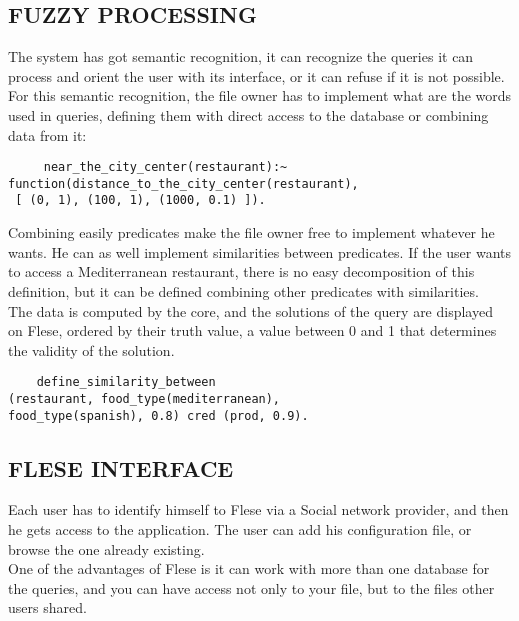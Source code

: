 \documentclass[a4paper,twoside]{article}
\begin{document}
\subsection{\uppercase{Fuzzy processing}}

The system has got semantic recognition, it can recognize the queries it can process and orient the user with its interface, or it can refuse if it is not possible.\\
For this semantic recognition, the file owner has to implement what are the words used in queries, defining them with direct access to the database or combining data from it:


\begin{small}
\begin{verbatim}
     near_the_city_center(restaurant):~ 
function(distance_to_the_city_center(restaurant),
 [ (0, 1), (100, 1), (1000, 0.1) ]).
\end{verbatim}
\end{small}

Combining easily predicates make the file owner free to implement whatever he wants. He can as well implement similarities between predicates. If the user wants to access a Mediterranean restaurant, there is no easy decomposition of this definition, but it can be defined combining other predicates with similarities. \\
The data is computed by the core, and the solutions of the query are displayed on Flese, ordered by their truth value, a value between 0 and 1 that determines the validity of the solution.

\begin{small}
\begin{verbatim}
    define_similarity_between
(restaurant, food_type(mediterranean), 
food_type(spanish), 0.8) cred (prod, 0.9).
\end{verbatim}
\end{small}

\subsection{\uppercase{Flese Interface}}
Each user has to identify himself to Flese via a Social network provider, and then he gets access to the application. The user can add his configuration file, or browse the one already existing.\\

One of the advantages of Flese is it can work with more than one database for the queries, and you can have access not only to your file, but to the files other users shared.\\
\end{document}

